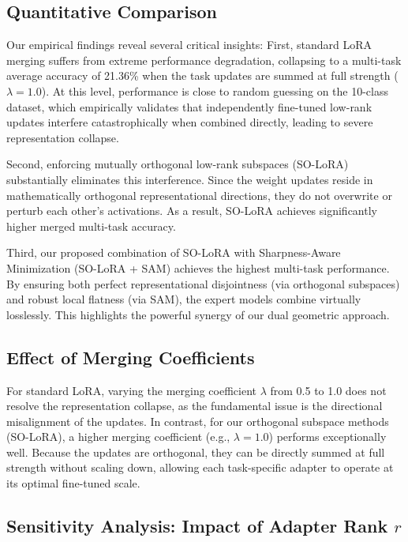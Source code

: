 \documentclass{article}
\theoremstyle{plain}
\theoremstyle{definition}
\theoremstyle{remark}
\begin{document}
\subsection{Quantitative Comparison}

Our empirical findings reveal several critical insights:
First, standard LoRA merging suffers from extreme performance degradation, collapsing to a multi-task average accuracy of 21.36\% when the task updates are summed at full strength ($\lambda = 1.0$). At this level, performance is close to random guessing on the 10-class dataset, which empirically validates that independently fine-tuned low-rank updates interfere catastrophically when combined directly, leading to severe representation collapse.

Second, enforcing mutually orthogonal low-rank subspaces (SO-LoRA) substantially eliminates this interference. Since the weight updates reside in mathematically orthogonal representational directions, they do not overwrite or perturb each other's activations. As a result, SO-LoRA achieves significantly higher merged multi-task accuracy.

Third, our proposed combination of SO-LoRA with Sharpness-Aware Minimization (SO-LoRA + SAM) achieves the highest multi-task performance. By ensuring both perfect representational disjointness (via orthogonal subspaces) and robust local flatness (via SAM), the expert models combine virtually losslessly. This highlights the powerful synergy of our dual geometric approach.

\subsection{Effect of Merging Coefficients}

For standard LoRA, varying the merging coefficient $\lambda$ from 0.5 to 1.0 does not resolve the representation collapse, as the fundamental issue is the directional misalignment of the updates.
In contrast, for our orthogonal subspace methods (SO-LoRA), a higher merging coefficient (e.g., $\lambda = 1.0$) performs exceptionally well. Because the updates are orthogonal, they can be directly summed at full strength without scaling down, allowing each task-specific adapter to operate at its optimal fine-tuned scale.

\subsection{Sensitivity Analysis: Impact of Adapter Rank $r$}
\end{document}
